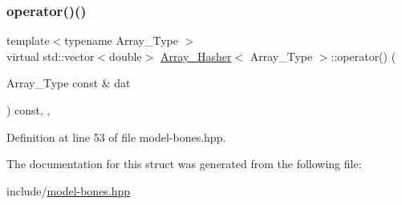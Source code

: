\subsubsection{\texorpdfstring{operator()()}{operator()()}}
{\footnotesize\ttfamily template$<$typename Array\+\_\+\+Type $>$ \\
virtual std\+::vector$<$double$>$ \hyperlink{struct_array___hasher}{Array\+\_\+\+Hasher}$<$ Array\+\_\+\+Type $>$\+::operator() (\begin{DoxyParamCaption}\item[{Array\+\_\+\+Type const \&}]{dat }\end{DoxyParamCaption}) const\hspace{0.3cm}{\ttfamily [inline]}, {\ttfamily [virtual]}, {\ttfamily [noexcept]}}



Definition at line 53 of file model-\/bones.\+hpp.



The documentation for this struct was generated from the following file\+:\begin{DoxyCompactItemize}
\item 
include/\hyperlink{model-bones_8hpp}{model-\/bones.\+hpp}\end{DoxyCompactItemize}
